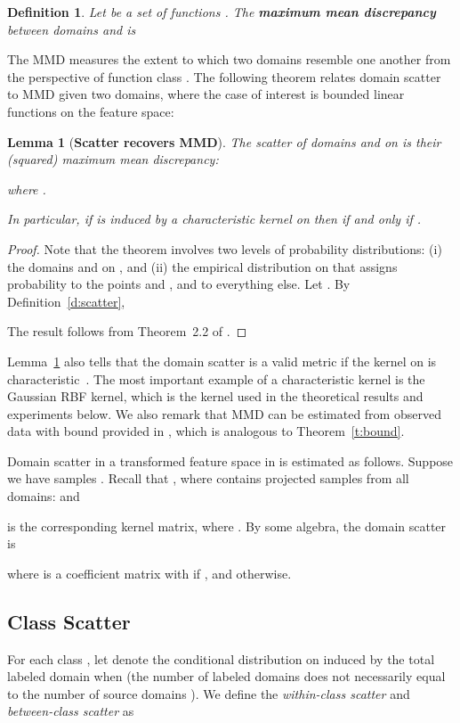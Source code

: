 \documentclass[10pt,journal,compsoc]{IEEEtran}
\newtheorem{lem}[thm]{Lemma}
\newtheorem{defn}{Definition}
\begin{document}
\begin{defn}
	Let  be a set of functions . The \textbf{maximum mean discrepancy} between domains  and  is
	
\end{defn}
The MMD measures the extent to which two domains resemble one another from the perspective of function class . 
The following theorem relates domain scatter to MMD given two domains, where the case of interest is bounded linear functions on the feature space:

\begin{lem}[\textbf{Scatter recovers MMD}]
	\label{t:mmd}
	The scatter of domains  and  on  is their (squared) maximum mean discrepancy:
	
	where .

	In particular, if  is induced by a characteristic kernel on  then  if and only if .
\end{lem}

\begin{proof}
	Note that the theorem involves two levels of probability distributions: 
	(i) the domains  and  on , and 
	(ii) the empirical distribution on  that assigns probability  to the points  and , and  to everything else.
	Let . By Definition~\ref{d:scatter},
	
	The result follows from Theorem~2.2 of \cite{Borgwardt:2006aa}.
\end{proof}
Lemma~\ref{t:mmd} also tells that the domain scatter is a valid metric if the kernel on  is characteristic~\cite{sriperumbudur:10}. The most important example of a characteristic kernel is the Gaussian RBF kernel, which is the kernel used in the theoretical results and experiments below.
We also remark that MMD can be estimated from observed data with bound provided in \cite{Gretton:2012aa}, which is analogous to Theorem~\ref{t:bound}.

Domain scatter in a transformed feature space in  is estimated as follows. Suppose we have  samples .
Recall that , where  contains projected samples from all domains:  and

is the corresponding kernel matrix, where .
By some algebra, the domain scatter is

where  is a coefficient matrix
with  if , and  otherwise.




\subsection{Class Scatter}
For each class , let  denote the conditional distribution on  induced by the total labeled domain  when   (the number of labeled domains  does not necessarily equal to the number of source domains ). 
We define the \emph{within-class scatter} and \emph{between-class scatter} as
\end{document}
